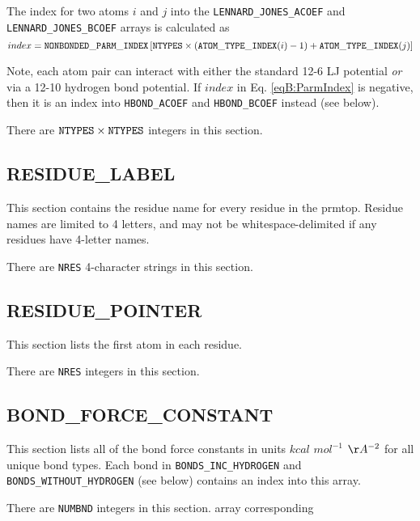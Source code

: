 The index for two atoms $i$ and $j$ into the {\tt LENNARD\_JONES\_ACOEF} and
{\tt LENNARD\_JONES\_BCOEF} arrays is calculated as 
\begin{equation}
   index = {\tt NONBONDED\_PARM\_INDEX} \left [ {\tt NTYPES} \times \left ( {\tt
      ATOM\_TYPE\_INDEX}(i) - 1 \right ) + {\tt ATOM\_TYPE\_INDEX}(j) \right ]
   \label{eqB:ParmIndex}
\end{equation}

Note, each atom pair can interact with either the standard 12-6 LJ potential
\emph{or} via a 12-10 hydrogen bond potential. If $index$ in Eq.
\ref{eqB:ParmIndex} is negative, then it is an index into {\tt HBOND\_ACOEF} and
{\tt HBOND\_BCOEF} instead (see below).


\noindent There are ${\tt NTYPES} \times {\tt NTYPES}$ integers in this section.

\subsection*{RESIDUE\_LABEL}

This section contains the residue name for every residue in the prmtop. Residue
names are limited to 4 letters, and may not be whitespace-delimited if any
residues have 4-letter names.


\noindent There are {\tt NRES} 4-character strings in this section.

\subsection*{RESIDUE\_POINTER}

This section lists the first atom in each residue.


\noindent There are {\tt NRES} integers in this section.

\subsection*{BOND\_FORCE\_CONSTANT}

This section lists all of the bond force constants in units $kcal$ $mol^{-1}$
$\AA^{-2}$ for all unique bond types. Each bond in {\tt BONDS\_INC\_HYDROGEN}
and {\tt BONDS\_WITHOUT\_HYDROGEN} (see below) contains an index into this
array.


\noindent There are {\tt NUMBND} integers in this section.
array corresponding 
